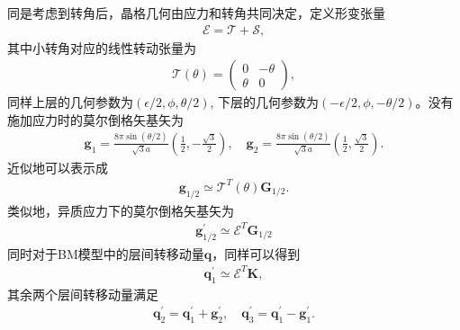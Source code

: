 \documentclass[10pt, oneside]{article}
\begin{document}
同是考虑到转角后，晶格几何由应力和转角共同决定，定义形变张量
\begin{align}
	\mathcal{E} = \mathcal{T }  + \mathcal{S },
\end{align}
其中小转角对应的线性转动张量为
\begin{align}
	\mathcal{T }\left(\theta\right) = \begin{pmatrix}
		0 & - \theta \\ \theta & 0
	\end{pmatrix},
\end{align}
同样上层的几何参数为\(\left(\epsilon/2, \phi, \theta/2\right)\), 下层的几何参数为\(\left(-\epsilon/2, \phi, -\theta/2\right)\)。没有施加应力时的莫尔倒格矢基矢为
\begin{align}
	\bm{g}_{1} = \frac{8 \pi \sin{\left(\theta/2\right)}}{\sqrt{3} a  } \left(\frac{1}{2}, -\frac{\sqrt{3}}{2}\right), \quad \bm{g}_{2} = \frac{8 \pi \sin{\left(\theta/2\right)}}{\sqrt{3} a  } \left(  \frac{1}{2}, \frac{\sqrt{3}}{2}\right).
\end{align}
近似地可以表示成
\begin{align}
	\bm{g}_{1/2} \simeq \mathcal{T}^{T} \left(\theta\right) \bm{G }_{1/2}.
\end{align}
类似地，异质应力下的莫尔倒格矢基矢为
\begin{align}
	\bm{g}^{\prime}_{1/2} \simeq \mathcal{E }^{T } \bm{G}_{1/2}
\end{align}
同时对于BM模型中的层间转移动量\(\bm{q}\)，同样可以得到
\begin{align}
	\bm{q}^{\prime}_{1} \simeq \mathcal{E}^{T} \bm{K},
\end{align}
其余两个层间转移动量满足
\begin{align}
	\bm{q}^{\prime}_{2} = \bm{q}^{\prime}_{1} + \bm{g}^{\prime}_{2},\quad \bm{q}^{\prime}_{3} = \bm{q}^{\prime}_{1} - \bm{g}^{\prime}_{1}.
\end{align}
\end{document}
